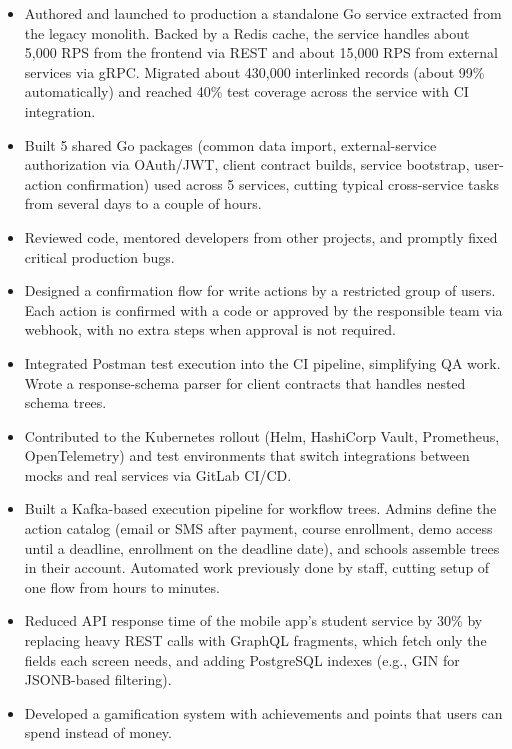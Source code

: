 \documentclass[10pt,a4paper]{article}
\begin{document}
\begin{itemize}
  \item Authored and launched to production a standalone Go service extracted from the legacy monolith. Backed by a Redis cache, the service handles about 5,000 RPS from the frontend via REST and about 15,000 RPS from external services via gRPC. Migrated about 430,000 interlinked records (about 99\% automatically) and reached 40\% test coverage across the service with CI integration.
  \item Built 5 shared Go packages (common data import, external-service authorization via OAuth/JWT, client contract builds, service bootstrap, user-action confirmation) used across 5 services, cutting typical cross-service tasks from several days to a couple of hours.
  \item Reviewed code, mentored developers from other projects, and promptly fixed critical production bugs.
  \item Designed a confirmation flow for write actions by a restricted group of users. Each action is confirmed with a code or approved by the responsible team via webhook, with no extra steps when approval is not required.
  \item Integrated Postman test execution into the CI pipeline, simplifying QA work. Wrote a response-schema parser for client contracts that handles nested schema trees.
  \item Contributed to the Kubernetes rollout (Helm, HashiCorp Vault, Prometheus, OpenTelemetry) and test environments that switch integrations between mocks and real services via GitLab CI/CD.
\end{itemize}

\begin{itemize}
  \item Built a Kafka-based execution pipeline for workflow trees. Admins define the action catalog (email or SMS after payment, course enrollment, demo access until a deadline, enrollment on the deadline date), and schools assemble trees in their account. Automated work previously done by staff, cutting setup of one flow from hours to minutes.
  \item Reduced API response time of the mobile app's student service by 30\% by replacing heavy REST calls with GraphQL fragments, which fetch only the fields each screen needs, and adding PostgreSQL indexes (e.g., GIN for JSONB-based filtering).
  \item Developed a gamification system with achievements and points that users can spend instead of money.
\end{itemize}
\end{document}
